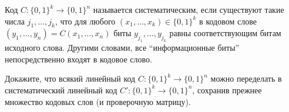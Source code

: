 Код $C: \{0, 1\}^k \rightarrow \{0, 1\}^n$ называется систематическим, если существуют такие числа $j_1, \dots, j_k$, что для
любого $(x_1, \dots, x_k) \in \{0, 1\}^k$ в кодовом слове $(y_1, \dots, y_n) = C(x_1, \dots, x_n)$ биты $y_{j_1}, \dots,
y_{j_k}$ равны соответствующим битам исходного слова. Другими словами, все ``информационные биты'' непосредственно входят в
кодовое слово.

Докажите, что всякий линейный код $C: \{0, 1\}^k \rightarrow \{0, 1\}^n$ можно переделать в систематический линейный код $C':
\{0, 1\}^k \rightarrow \{0, 1\}^n$, сохранив прежнее множество кодовых слов (и проверочную матрицу).
